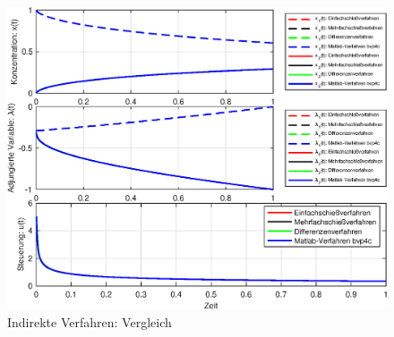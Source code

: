 \begin{figure}[h!]
	\centering
	\includegraphics[width=1\textwidth]{images/CompareIndirect_Method}
	\caption{Indirekte Verfahren: Vergleich}
	\label{fig:CompareBound}
\end{figure}
%
%
%

